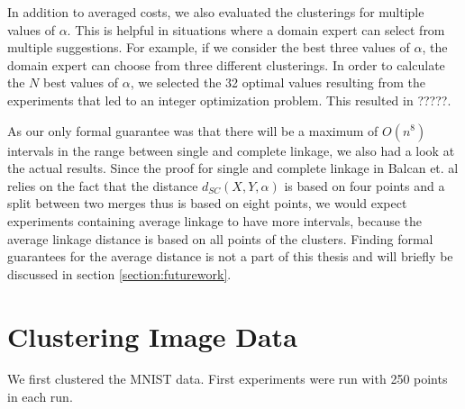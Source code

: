 In addition to averaged costs, we also evaluated the clusterings for multiple values of $\alpha$. This is helpful in situations where a domain expert can select from multiple suggestions. For example, if we consider the best three values of $\alpha$, the domain expert can choose from three different clusterings. In order to calculate the $N$ best values of $\alpha$, we selected the 32 optimal values resulting from the experiments that led to an integer optimization problem. This resulted in ?????.

As our only formal guarantee was that there will be a maximum of $O(n^8)$ intervals in the range between single and complete linkage, we also had a look at the actual results. Since the proof for single and complete linkage in Balcan et. al \cite{DBLP:journals/corr/BalcanNVW16} relies on the fact that the distance $d_{SC}(X,Y,\alpha)$ is based on four points and a split between two merges thus is based on eight points, we would expect experiments containing average linkage to have more intervals, because the average linkage distance is based on all points of the clusters. Finding formal guarantees for the average distance is not a part of this thesis and will briefly be discussed in section \ref{section:futurework}.

\section{Clustering Image Data}

We first clustered the MNIST data. First experiments were run with 250 points in each run.


